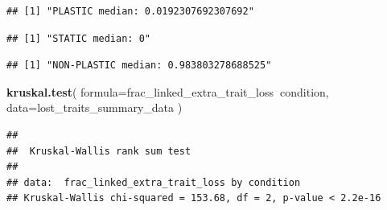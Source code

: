 \documentclass[]{book}
\newenvironment{Shaded}{\begin{snugshade}}{\end{snugshade}}
\newcommand{\DataTypeTok}[1]{\textcolor[rgb]{0.13,0.29,0.53}{#1}}
\newcommand{\FloatTok}[1]{\textcolor[rgb]{0.00,0.00,0.81}{#1}}
\newcommand{\KeywordTok}[1]{\textcolor[rgb]{0.13,0.29,0.53}{\textbf{#1}}}
\newcommand{\NormalTok}[1]{#1}
\newcommand{\OperatorTok}[1]{\textcolor[rgb]{0.81,0.36,0.00}{\textbf{#1}}}
\newcommand{\OtherTok}[1]{\textcolor[rgb]{0.56,0.35,0.01}{#1}}
\newcommand{\StringTok}[1]{\textcolor[rgb]{0.31,0.60,0.02}{#1}}
\begin{document}
\begin{verbatim}
## [1] "PLASTIC median: 0.0192307692307692"
\end{verbatim}

\begin{Shaded}
\end{Shaded}

\begin{verbatim}
## [1] "STATIC median: 0"
\end{verbatim}

\begin{Shaded}
\end{Shaded}

\begin{verbatim}
## [1] "NON-PLASTIC median: 0.983803278688525"
\end{verbatim}

\begin{Shaded}
\begin{Highlighting}[]
\KeywordTok{kruskal.test}\NormalTok{(}
  \DataTypeTok{formula=}\NormalTok{frac_linked_extra_trait_loss}\OperatorTok{~}\NormalTok{condition,}
  \DataTypeTok{data=}\NormalTok{lost_traits_summary_data}
\NormalTok{)}
\end{Highlighting}
\end{Shaded}

\begin{verbatim}
## 
##  Kruskal-Wallis rank sum test
## 
## data:  frac_linked_extra_trait_loss by condition
## Kruskal-Wallis chi-squared = 153.68, df = 2, p-value < 2.2e-16
\end{verbatim}

\begin{Shaded}
\end{Shaded}
\end{document}

